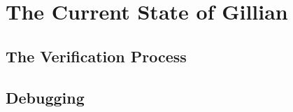 
\chapter{The Current State of Gillian}\label{sec:current}

\section{The Verification Process}\label{sec:current:verification}

\section{Debugging}\label{sec:current:debugging}
